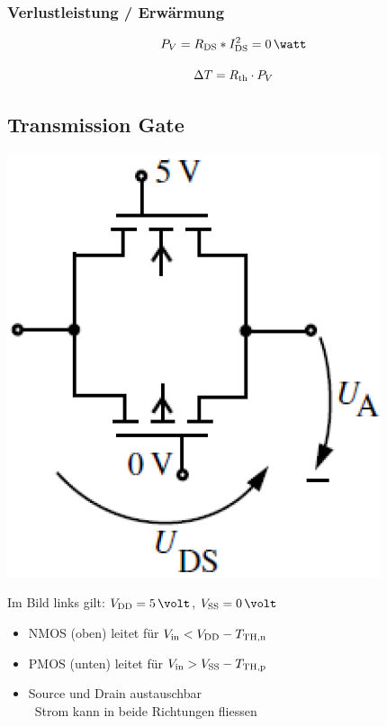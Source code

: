 \subsubsection{Verlustleistung / Erwärmung}

\begin{minipage}[c]{0.48\columnwidth}
    $$  P_V = R_{\rm DS} * I_{\rm DS}^2 = 0 \, \watt $$
\end{minipage}
\hfill
\begin{minipage}[c]{0.48\columnwidth}
    $$ \Delta T = R_{\rm th} \cdot P_V $$
\end{minipage}


\subsection{Transmission Gate}

\begin{minipage}[c]{0.22\columnwidth}
    \includegraphics[width=\columnwidth]{images/transmission_gate.png}
\end{minipage}
\hfill
\begin{minipage}[c]{0.68\columnwidth}
    Im Bild links gilt: $V_{\rm DD} = 5 \, \volt$, $V_{\rm SS} = 0 \, \volt$ 

    \begin{itemize}
        \item NMOS (oben) leitet für $V_{\rm in} < V_{\rm DD} - T_{\rm TH,n}$
        \item PMOS (unten) leitet für $V_{\rm in} > V_{\rm SS} - T_{\rm TH,p}$
        \item Source und Drain austauschbar \\
            \textrightarrow\ Strom kann in beide Richtungen fliessen
    \end{itemize}
\end{minipage}

